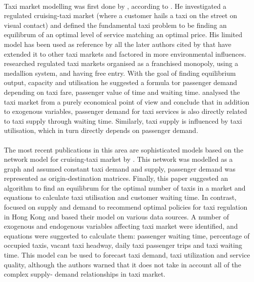 \paragraph{}Taxi market modelling was first done by
\textcite{Douglas1972taxi+regulation}, according to
\textcite{Salanova2011taxi+review}. He investigated a regulated cruising-taxi
market (where a customer hails a taxi on the street on visual contact) and
defined the fundamental taxi problem to be finding an equilibrum of an optimal
level of service matching an optimal price. His limited model has been used as
reference by all the later authors cited by \textcite{Salanova2011taxi+review}
that have extended it to other taxi markets and factored in more environmental
influences. \textcite{Devany1975taxi+capacity} researched regulated taxi
markets organised as a franchised monopoly, using a medallion system, and
having free entry. With the goal of finding equilibrium output, capacity and
utilisation he suggested a formula tor passenger demand depending on taxi fare,
passenger value of time and waiting time. \textcite{Manski1967taxi+demand}
analysed the taxi market from a purely economical point of view and conclude
that in addition to exogenous variables, passenger demand for taxi services is
also directly related to taxi supply through waiting time. Similarly, taxi
supply is influenced by taxi utilisation, which in turn directly depends on
passenger demand.

\paragraph{}The most recent publications in this area are sophisticated models
based on the network model for cruising-taxi market by
\textcite{Yang1998taxi+network}. This network was modelled as a graph and
assumed constant taxi demand and supply, passenger demand was represented as
origin-destination matrices. Finally, this paper suggested an algorithm to find
an equilibrum for the optimal number of taxis in a market and equations to
calculate taxi utilisation and customer waiting time. In contrast,
\textcite{Yang2000taxi+utilization} focused on supply and demand to recommend
optimal policies for taxi regulation in Hong Kong and based their model on
various data sources. A number of exogenous and endogenous variables affecting
taxi market were identified, and equations were suggested to calculate them:
passenger waiting time, percentage of occupied taxis, vacant taxi headway,
daily taxi passenger trips and taxi waiting time. This model can be used to
forecast taxi demand, taxi utilization and service quality, although the
authors warned that it does not take in account all of the complex supply-
demand relationships in taxi market.

